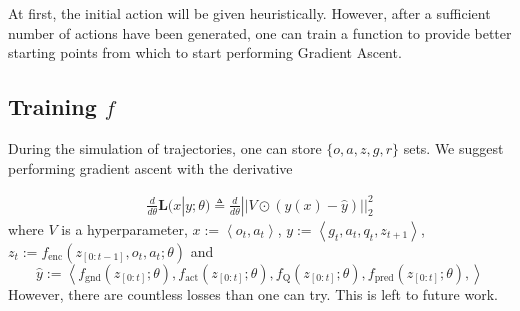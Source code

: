 \documentclass[]{article}
\begin{document}
At first, the initial action will be given heuristically. However, after a sufficient number of actions have been generated, one can train a function to provide better starting points from which to start performing Gradient Ascent.


\subsection{Training $f$}

During the simulation of trajectories, one can store $\{o, a, z, g, r\}$ sets. We suggest performing gradient ascent with the derivative

\begin{align}
\frac{d}{d \theta} \boldsymbol{L}(x | y ; \theta)
\triangleq
\frac{d}{d \theta}  || V \odot (y(x) - \hat{y} )||^2_2
\end{align} 
where $V$ is a hyperparameter, $x := \left<o_t, a_t\right>$, $y := \left<g_t, a_t, q_t, z_{t+1}\right>$,  $z_t := f_{\text{enc}}(z_{[0:t-1]}, o_t, a_t ; \theta)$ and $$\hat{y} := \left<f_{\text{gnd}}(z_{[0:t]} ; \theta), f_{\text{act}}(z_{[0:t]} ; \theta), f_{\text{Q}}(z_{[0:t]} ; \theta), f_{\text{pred}}(z_{[0:t]};\theta), \right>$$
However, there are countless losses than one can try. This is left to future work. 
\end{document}
